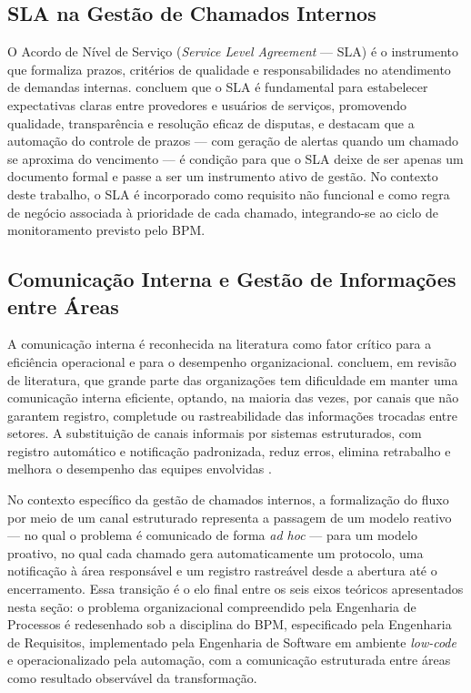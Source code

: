 \subsection{SLA na Gestão de Chamados Internos}

O Acordo de Nível de Serviço (\textit{Service Level
Agreement} --- SLA) é o instrumento que formaliza prazos,
critérios de qualidade e responsabilidades no atendimento de
demandas internas. \cite{Malheiros2024} concluem que o SLA é
fundamental para estabelecer expectativas claras entre
provedores e usuários de serviços, promovendo qualidade,
transparência e resolução eficaz de disputas, e destacam que
a automação do controle de prazos --- com geração de alertas
quando um chamado se aproxima do vencimento --- é condição
para que o SLA deixe de ser apenas um documento formal e passe
a ser um instrumento ativo de gestão. No contexto deste
trabalho, o SLA é incorporado como requisito não funcional e
como regra de negócio associada à prioridade de cada chamado,
integrando-se ao ciclo de monitoramento previsto pelo BPM.

\subsection{Comunicação Interna e Gestão de Informações entre
Áreas}

A comunicação interna é reconhecida na literatura como fator
crítico para a eficiência operacional e para o desempenho
organizacional. \cite{Souza2023} concluem, em revisão de
literatura, que grande parte das organizações tem dificuldade
em manter uma comunicação interna eficiente, optando, na
maioria das vezes, por canais que não garantem registro,
completude ou rastreabilidade das informações trocadas entre
setores. A substituição de canais informais por sistemas
estruturados, com registro automático e notificação
padronizada, reduz erros, elimina retrabalho e melhora o
desempenho das equipes envolvidas \cite{Lopes2024}.

No contexto específico da gestão de chamados internos, a
formalização do fluxo por meio de um canal estruturado
representa a passagem de um modelo reativo --- no qual o
problema é comunicado de forma \textit{ad hoc} --- para um
modelo proativo, no qual cada chamado gera automaticamente um
protocolo, uma notificação à área responsável e um registro
rastreável desde a abertura até o encerramento. Essa
transição é o elo final entre os seis eixos teóricos
apresentados nesta seção: o problema organizacional
compreendido pela Engenharia de Processos é redesenhado sob a
disciplina do BPM, especificado pela Engenharia de Requisitos,
implementado pela Engenharia de Software em ambiente
\textit{low-code} e operacionalizado pela automação, com a
comunicação estruturada entre áreas como resultado observável
da transformação.
